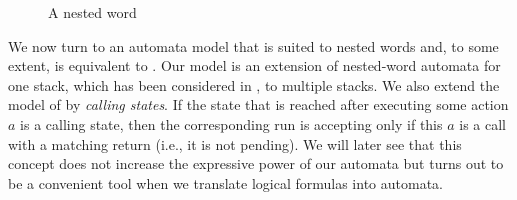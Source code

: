 \documentclass{LMCS}
\begin{document}
\begin{figure}[h]
\begin{center}
\caption{A nested word\label{fig:exaNW}}
\end{center}
\end{figure}

We now turn to an automata model that is suited to nested words and, to some
extent, is equivalent to \MVPA. Our model is an extension of nested-word
automata for one stack, which has been considered in \cite{AlurM06}, to
multiple stacks. We also extend the model of \cite{AlurM06} by \emph{calling
  states}. If the state that is reached after executing some action $a$ is a
calling state, then the corresponding run is accepting only if this $a$ is a
call with a matching return (i.e., it is not pending). We will later see that
this concept does not increase the expressive power of our automata but turns
out to be a convenient tool when we translate logical formulas into automata.
\end{document}
